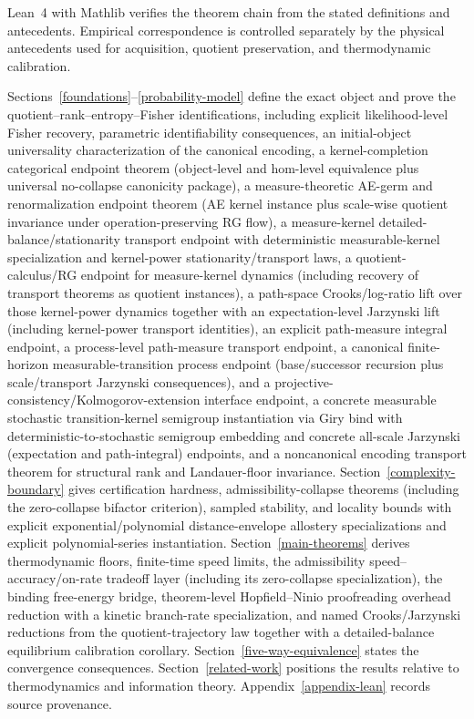 Lean~4 with Mathlib verifies the theorem chain from the stated definitions and antecedents. Empirical correspondence is controlled separately by the physical antecedents used for acquisition, quotient preservation, and thermodynamic calibration.

Sections~\ref{foundations}--\ref{probability-model} define the exact object and prove the quotient--rank--entropy--Fisher identifications, including explicit likelihood-level Fisher recovery, parametric identifiability consequences, an initial-object universality characterization of the canonical encoding, a kernel-completion categorical endpoint theorem (object-level and hom-level equivalence plus universal no-collapse canonicity package), a measure-theoretic AE-germ and renormalization endpoint theorem (AE kernel instance plus scale-wise quotient invariance under operation-preserving RG flow), a measure-kernel detailed-balance/stationarity transport endpoint with deterministic measurable-kernel specialization and kernel-power stationarity/transport laws, a quotient-calculus/RG endpoint for measure-kernel dynamics (including recovery of transport theorems as quotient instances), a path-space Crooks/log-ratio lift over those kernel-power dynamics together with an expectation-level Jarzynski lift (including kernel-power transport identities), an explicit path-measure integral endpoint, a process-level path-measure transport endpoint, a canonical finite-horizon measurable-transition process endpoint (base/successor recursion plus scale/transport Jarzynski consequences), and a projective-consistency/Kolmogorov-extension interface endpoint, a concrete measurable stochastic transition-kernel semigroup instantiation via Giry bind with deterministic-to-stochastic semigroup embedding and concrete all-scale Jarzynski (expectation and path-integral) endpoints, and a noncanonical encoding transport theorem for structural rank and Landauer-floor invariance. Section~\ref{complexity-boundary} gives certification hardness, admissibility-collapse theorems (including the zero-collapse bifactor criterion), sampled stability, and locality bounds with explicit exponential/polynomial distance-envelope allostery specializations and explicit polynomial-series instantiation. Section~\ref{main-theorems} derives thermodynamic floors, finite-time speed limits, the admissibility speed--accuracy/on-rate tradeoff layer (including its zero-collapse specialization), the binding free-energy bridge, theorem-level Hopfield--Ninio proofreading overhead reduction with a kinetic branch-rate specialization, and named Crooks/Jarzynski reductions from the quotient-trajectory law together with a detailed-balance equilibrium calibration corollary. Section~\ref{five-way-equivalence} states the convergence consequences. Section~\ref{related-work} positions the results relative to thermodynamics and information theory. Appendix~\ref{appendix-lean} records source provenance.
